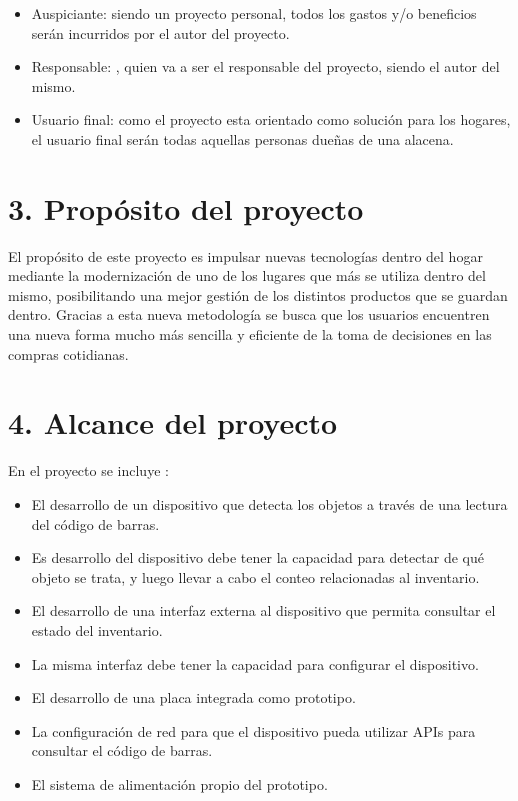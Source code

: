 \documentclass[
11pt, %
codirector, %
]{charter}
\begin{document}
\begin{itemize}
	\item Auspiciante: siendo un proyecto personal, todos los gastos y/o beneficios serán incurridos por el autor del proyecto.
	\item Responsable: \authorname, quien va a ser el responsable del proyecto, siendo el autor del mismo.
 	\item Usuario final: como el proyecto esta orientado como solución para los hogares, el usuario final serán todas aquellas personas dueñas de una alacena.
 
\end{itemize}



\section{3. Propósito del proyecto}
\label{sec:proposito}

El propósito de este proyecto es impulsar nuevas tecnologías dentro del hogar mediante la modernización de uno de los lugares que más se utiliza dentro del mismo, posibilitando una mejor gestión de los distintos productos que se guardan dentro. Gracias a esta nueva metodología se busca que los usuarios encuentren una nueva forma mucho más sencilla y eficiente de la toma de decisiones en las compras cotidianas.

\section{4. Alcance del proyecto}
\label{sec:alcance}

En el proyecto se incluye :

\begin{itemize}
	\item El desarrollo de un dispositivo que detecta los objetos a través de una lectura del código de barras.
	\item Es desarrollo del dispositivo debe tener la capacidad para detectar de qué objeto se trata, y luego llevar a cabo el conteo relacionadas al inventario.
 	\item El desarrollo de una interfaz externa al dispositivo que permita consultar el estado del inventario.
  \item La misma interfaz debe tener la capacidad para configurar el dispositivo.
  \item El desarrollo de una placa integrada como prototipo.
  \item La configuración de red para que el dispositivo pueda utilizar APIs para consultar el código de barras.
  \item El sistema de alimentación propio del prototipo.
  
\end{itemize}
\end{document}
